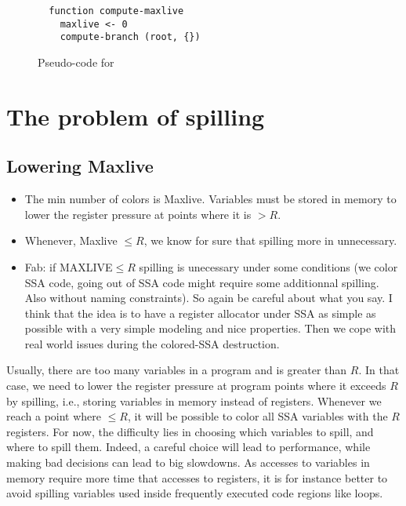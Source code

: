 {\begin{figure}[ht]
\begin{verbatim}
  function compute-maxlive
    maxlive <- 0
    compute-branch (root, {})
  \end{verbatim}
  \caption{Pseudo-code for \maxlive}
  \label{code:compute-maxlive}
\end{figure}




\section{The problem of spilling}
\subsection{Lowering Maxlive}

{\sl
\begin{itemize}
  \item The min number of colors is Maxlive. Variables must be stored in memory 
    to lower the register pressure at points where it is $>R$.
  \item Whenever, Maxlive $\leq R$, we know for sure that spilling more in 
    unnecessary.
  \item Fab: if MAXLIVE$\leq R$ spilling is unecessary under some conditions (we color SSA code, going out of SSA code might require some additionnal spilling. Also without naming constraints). So again be careful about what you say. I think that the idea is to have a register allocator under SSA as simple as possible with a very simple modeling and nice properties. Then we cope with real world issues during the colored-SSA destruction.
\end{itemize}
}

Usually, there are too many variables in a program and \maxlive is greater than 
$R$. In that case, we need to lower the register pressure at program points 
where it exceeds $R$ by spilling, i.e., storing variables in memory instead of 
registers. Whenever we reach a point where \maxlive $\leq R$, it will be 
possible to color all SSA variables with the $R$ registers. For now, the 
difficulty lies in choosing which variables to spill, and where to spill them. 
Indeed, a careful choice will lead to performance, while making bad decisions 
can lead to big slowdowns. As accesses to variables in memory require more time 
that accesses to registers, it is for instance better to avoid spilling 
variables used inside frequently executed code regions like loops.



}
